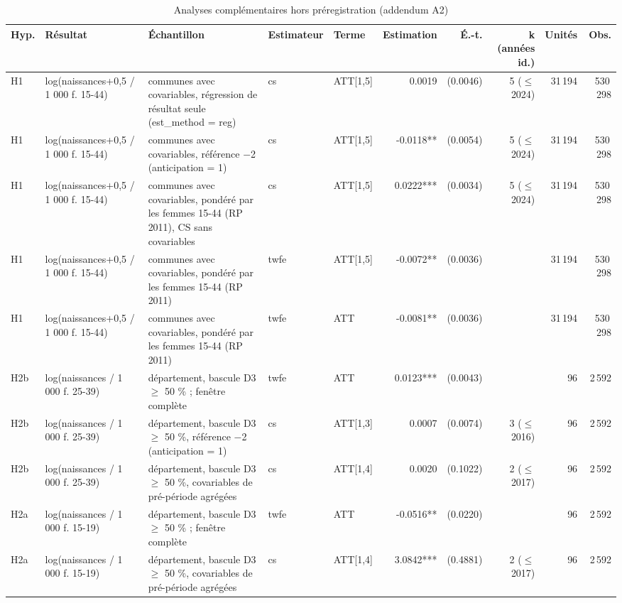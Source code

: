 \begin{table}\centering
\begin{threeparttable}
\caption{Analyses complémentaires hors préregistration (addendum A2)}\label{tab:exploratory}
\scriptsize
\begin{tabular}{lp{3.8cm}p{4.6cm}lp{3.5cm}rrrrr}
\toprule
Hyp. & Résultat & Échantillon & Estimateur & Terme & Estimation & É.-t. & k (années id.) & Unités & Obs. \\
\midrule
H1 & log(naissances+0,5 / 1 000 f. 15-44) & communes avec covariables, régression de résultat seule (est\_method = reg) & cs & ATT[1,5] & 0.0019 & (0.0046) & 5 ($\leq$ 2024) & 31\,194 & 530\,298 \\
H1 & log(naissances+0,5 / 1 000 f. 15-44) & communes avec covariables, référence $-$2 (anticipation = 1) & cs & ATT[1,5] & -0.0118** & (0.0054) & 5 ($\leq$ 2024) & 31\,194 & 530\,298 \\
H1 & log(naissances+0,5 / 1 000 f. 15-44) & communes avec covariables, pondéré par les femmes 15-44 (RP 2011), CS sans covariables & cs & ATT[1,5] & 0.0222*** & (0.0034) & 5 ($\leq$ 2024) & 31\,194 & 530\,298 \\
H1 & log(naissances+0,5 / 1 000 f. 15-44) & communes avec covariables, pondéré par les femmes 15-44 (RP 2011) & twfe & ATT[1,5] & -0.0072** & (0.0036) &  & 31\,194 & 530\,298 \\
H1 & log(naissances+0,5 / 1 000 f. 15-44) & communes avec covariables, pondéré par les femmes 15-44 (RP 2011) & twfe & ATT & -0.0081** & (0.0036) &  & 31\,194 & 530\,298 \\
H2b & log(naissances / 1 000 f. 25-39) & département, bascule D3 $\geq$ 50 \% ; fenêtre complète & twfe & ATT & 0.0123*** & (0.0043) &  & 96 & 2\,592 \\
H2b & log(naissances / 1 000 f. 25-39) & département, bascule D3 $\geq$ 50 \%, référence $-$2 (anticipation = 1) & cs & ATT[1,3] & 0.0007 & (0.0074) & 3 ($\leq$ 2016) & 96 & 2\,592 \\
H2b & log(naissances / 1 000 f. 25-39) & département, bascule D3 $\geq$ 50 \%, covariables de pré-période agrégées & cs & ATT[1,4] & 0.0020 & (0.1022) & 2 ($\leq$ 2017) & 96 & 2\,592 \\
H2a & log(naissances / 1 000 f. 15-19) & département, bascule D3 $\geq$ 50 \% ; fenêtre complète & twfe & ATT & -0.0516** & (0.0220) &  & 96 & 2\,592 \\
H2a & log(naissances / 1 000 f. 15-19) & département, bascule D3 $\geq$ 50 \%, covariables de pré-période agrégées & cs & ATT[1,4] & 3.0842*** & (0.4881) & 2 ($\leq$ 2017) & 96 & 2\,592 \\

\end{tabular}
\end{threeparttable}
\end{table}
